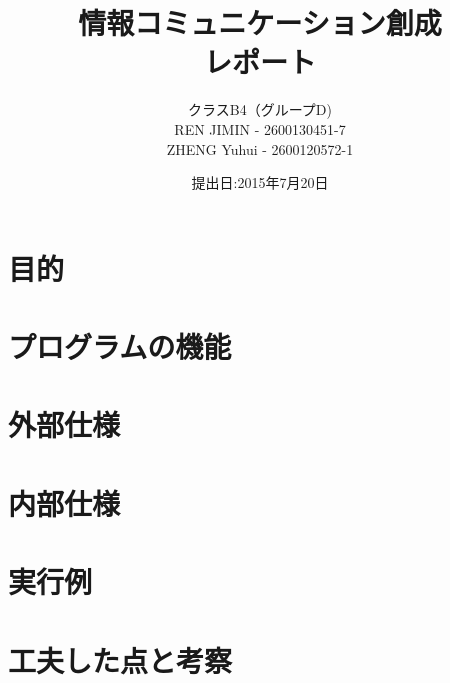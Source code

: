 \documentclass{jarticle}
\title{情報コミュニケーション創成\\レポート}
\author{クラスB4（グループD)\\REN JIMIN - 2600130451-7\\ZHENG Yuhui - 2600120572-1}
\date{提出日:2015年7月20日}
\begin{document}
\maketitle
\tableofcontents
\clearpage

\section{目的}
	
\section{プログラムの機能}
	
\section{外部仕様}
	
\section{内部仕様}
	
\section{実行例}
	
\section{工夫した点と考察}
		
\end{document}
